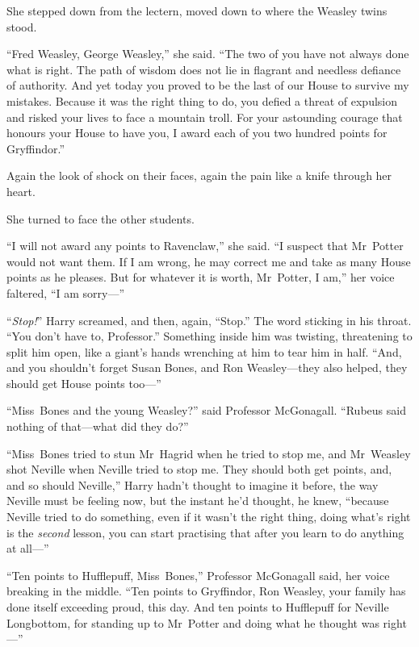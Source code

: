She stepped down from the lectern, moved down to where the Weasley twins stood.

“Fred Weasley, George Weasley,” she said.
“The two of you have not always done what is right. The path of wisdom does not lie in flagrant and needless defiance of authority. And yet today you proved to be the last of our House to survive my mistakes. Because it was the right thing to do, you defied a threat of expulsion and risked your lives to face a mountain troll. For your astounding courage that honours your House to have you, I award each of you two hundred points for Gryffindor.”

Again the look of shock on their faces, again the pain like a knife through her heart.

She turned to face the other students.

“I will not award any points to Ravenclaw,” she said.
“I suspect that Mr~Potter would not want them. If I am wrong, he may correct me and take as many House points as he pleases. But for whatever it is worth, Mr~Potter, I am,” her voice faltered,
“I am sorry—”

\later

“\emph{Stop!}” Harry screamed, and then, again,
“Stop.” The word sticking in his throat.
“You don’t have to, Professor.” Something inside him was twisting, threatening to split him open, like a giant’s hands wrenching at him to tear him in half.
“And, and you shouldn’t forget Susan Bones, and Ron Weasley—they also helped, they should get House points too—”

“Miss~Bones and the young Weasley?” said Professor McGonagall.
“Rubeus said nothing of that—what did they do?”

“Miss~Bones tried to stun Mr~Hagrid when he tried to stop me, and Mr~Weasley shot Neville when Neville tried to stop me. They should both get points, and, and so should Neville,” Harry hadn’t thought to imagine it before, the way Neville must be feeling now, but the instant he’d thought, he knew, “because Neville tried to do something, even if it wasn’t the right thing, doing what’s right is the \emph{second} lesson, you can start practising that after you learn to do anything at all—”

“Ten points to Hufflepuff, Miss~Bones,” Professor McGonagall said, her voice breaking in the middle.
“Ten points to Gryffindor, Ron Weasley, your family has done itself exceeding proud, this day. And ten points to Hufflepuff for Neville Longbottom, for standing up to Mr~Potter and doing what he thought was right—”

